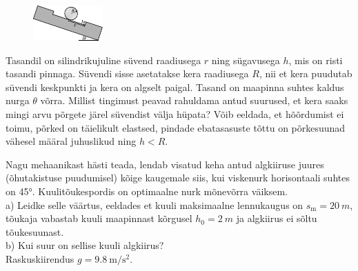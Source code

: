 \documentclass[10pt]{article}
\begin{document}

\begin{figure}
\vspace{-1em}
  \begin{center}
    \includegraphics[width=1\linewidth]{2023-v2g-08-yl.pdf}
  \end{center}
  \vspace{-2em}
\end{figure}

Tasandil on silindrikujuline süvend raadiusega $r$ ning sügavusega $h$, mis on risti tasandi pinnaga. Süvendi sisse asetatakse kera raadiusega $R$, nii et kera puudutab süvendi keskpunkti ja kera on algselt paigal. Tasand on maapinna suhtes kaldus nurga $\theta$ võrra. Millist tingimust peavad rahuldama antud suurused, et kera saaks mingi arvu põrgete järel süvendist välja hüpata? Võib eeldada, et hõõrdumist ei toimu, põrked on täielikult elastsed, pindade ebatasasuste tõttu on põrkesuunad vähesel määral juhuslikud ning $h < R$.
\probend
\bigskip


Nagu mehaanikast hästi teada, lendab visatud keha antud algkiiruse juures (õhutakistuse puudumisel) kõige kaugemale siis, kui viskenurk horisontaali suhtes on \ang{45}. Kuulitõukespordis on optimaalne nurk mõnevõrra väiksem.
\\a) Leidke selle väärtus, eeldades et kuuli maksimaalne lennukaugus on $s_\text{m}=\SI{20}{m}$, tõukaja vabastab kuuli maapinnast kõrgusel $h_0=\SI{2}{m}$ ja algkiirus ei sõltu tõukesuunast.
\\b) Kui suur on sellise kuuli algkiirus?
\\Raskuskiirendus $g=\SI{9.8}{\meter\per\second\squared}$.
\probend
\bigskip
\end{document}
